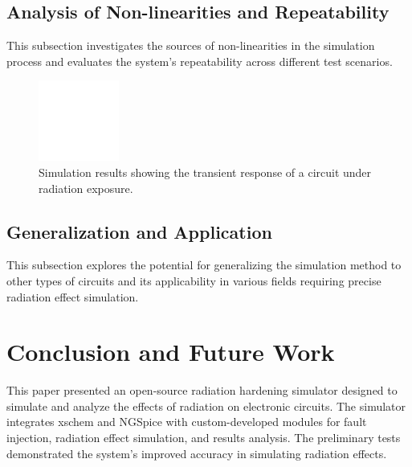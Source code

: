 \documentclass[conference]{IEEEtran}
\begin{document}
\subsection{Analysis of Non-linearities and Repeatability}
This subsection investigates the sources of non-linearities in the simulation process and evaluates the system's repeatability across different test scenarios.

\begin{figure}[htbp]
\centering
\includegraphics[width=0.8\linewidth]{simulation_results_placeholder.png}
\caption{Simulation results showing the transient response of a circuit under radiation exposure.}
\label{fig:simulation_results}
\end{figure}

\subsection{Generalization and Application}
This subsection explores the potential for generalizing the simulation method to other types of circuits and its applicability in various fields requiring precise radiation effect simulation.

\section{Conclusion and Future Work}
This paper presented an open-source radiation hardening simulator designed to simulate and analyze the effects of radiation on electronic circuits. The simulator integrates xschem and NGSpice with custom-developed modules for fault injection, radiation effect simulation, and results analysis. The preliminary tests demonstrated the system's improved accuracy in simulating radiation effects.
\end{document}
